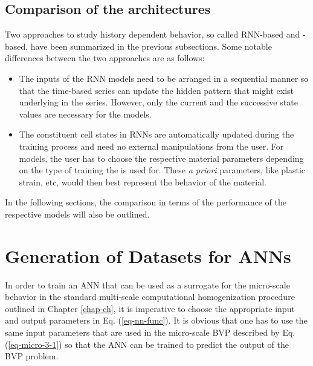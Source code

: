 \subsection{Comparison of the architectures}\label{nn-compare}
Two approaches to study history dependent behavior, so called RNN-based and \fnn-based, have been summarized in the previous subsections. Some notable differences between the two approaches are as follows:
\begin{itemize}
	\item The inputs of the RNN models need to be arranged in a sequential manner so that the time-based series can update the hidden pattern that might exist underlying in the series. However, only the current and the successive state values are necessary for the \fnn models.
	\item The constituent cell states in RNNs are automatically updated during the training process and need no external manipulations from the user. For \fnn models, the user has to choose the respective material parameters depending on the type of training the \fnn is used for. These \textit{a priori} parameters, like plastic strain, etc, would then best represent the behavior of the material.
\end{itemize}
In the following sections, the comparison in terms of the performance of the respective models will also be outlined.

\section{Generation of Datasets for ANNs}\label{nn-gendata}
In order to train an ANN that can be used as a surrogate for the micro-scale behavior in the standard multi-scale computational homogenization procedure outlined in Chapter \ref{chap-ch}, it is imperative to choose the appropriate input and output parameters in Eq. (\ref{eq-nn-func}). It is obvious that one has to use the same input parameters that are used in the micro-scale BVP described by Eq. (\ref{eq-micro-3-1}) so that the ANN can be trained to predict the output of the BVP problem. 

